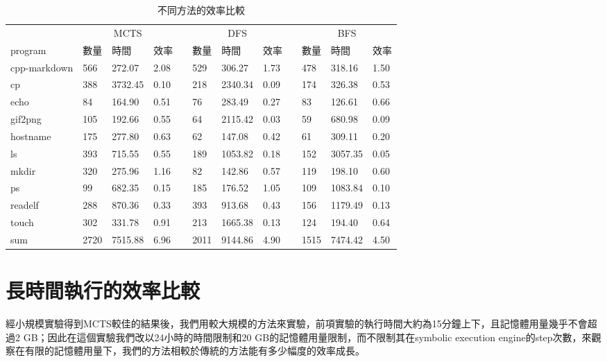 \documentclass[12pt,a4paper,oneside]{book}
\begin{document}
\begin{table}[htbp]
\centering
\caption{不同方法的效率比較}
\label{testMethod}
\begin{tabular}{@{}llllllllllll@{}} \toprule
             & \multicolumn{3}{c}{MCTS} & \phantom{abc} & \multicolumn{3}{c}{DFS} & \phantom{abc} & \multicolumn{3}{c}{BFS} \\ \cmidrule{2-4} \cmidrule{6-8} \cmidrule{10-12}
program      & 數量   & 時間   & 效率   & & 數量   & 時間   & 效率   & & 數量    & 時間   & 效率      \\ \midrule
cpp-markdown & 566    & 272.07 & 2.08 & & 529    & 306.27& 1.73  & & 478     & 318.16 & 1.50   \\
cp           & 388    & 3732.45& 0.10 & & 218    &2340.34& 0.09  & & 174     & 326.38 & 0.53   \\
echo         &  84    & 164.90 & 0.51 & &  76    & 283.49& 0.27  & &  83     & 126.61 & 0.66   \\
gif2png      & 105    & 192.66 & 0.55 & &  64    &2115.42& 0.03  & &  59     & 680.98 & 0.09   \\ 
hostname     & 175    & 277.80 & 0.63 & &  62    & 147.08& 0.42  & &  61     & 309.11 & 0.20   \\
ls           & 393    & 715.55 & 0.55 & & 189    &1053.82& 0.18  & & 152     &3057.35 & 0.05   \\
mkdir        & 320    & 275.96 & 1.16 & &  82    & 142.86& 0.57  & & 119     & 198.10 & 0.60   \\
ps           &  99    & 682.35 & 0.15 & & 185    & 176.52& 1.05  & & 109     &1083.84 & 0.10   \\
readelf      & 288    & 870.36 & 0.33 & & 393    & 913.68& 0.43  & & 156     &1179.49 & 0.13   \\
touch        & 302    & 331.78 & 0.91 & & 213    &1665.38& 0.13  & & 124     & 194.40 & 0.64   \\ \hline
sum          & 2720   & 7515.88& 6.96 & & 2011   &9144.86& 4.90  & & 1515    &7474.42 & 4.50   \\ \bottomrule
\end{tabular}
\end{table}

\section{長時間執行的效率比較}

經小規模實驗得到MCTS較佳的結果後，我們用較大規模的方法來實驗，前項實驗的執行時間大約為15分鐘上下，且記憶體用量幾乎不會超過2 GB；因此在這個實驗我們改以24小時的時間限制和20 GB的記憶體用量限制，而不限制其在symbolic execution engine的step次數，來觀察在有限的記憶體用量下，我們的方法相較於傳統的方法能有多少幅度的效率成長。
\end{document}
